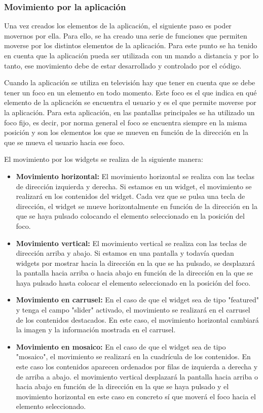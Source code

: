 \subsubsection{Movimiento por la aplicación}
\label{sec:movimiento_aplicacion}

Una vez creados los elementos de la aplicación, el siguiente paso es poder movernos por ella. Para ello, se ha creado una serie de funciones que permiten
moverse por los distintos elementos de la aplicación. Para este punto se ha tenido en cuenta que la aplicación pueda ser utilizada con un mando a distancia
y por lo tanto, ese movimiento debe de estar desarrollado y controlado por el código. 

Cuando la aplicación se utiliza en televisión hay que tener en cuenta que se debe tener un foco en un elemento en todo momento. Este foco es el que indica
en qué elemento de la aplicación se encuentra el usuario y es el que permite moverse por la aplicación. Para esta aplicación, en las pantallas principales
se ha utilizado un foco fijo, es decir, por norma general el foco se encuentra siempre en la misma posición y son los elementos los que se mueven en función
de la dirección en la que se mueva el usuario hacia ese foco. 

El movimiento por los widgets se realiza de la siguiente manera:
\begin{itemize}
    \item \textbf{Movimiento horizontal:} El movimiento horizontal se realiza con las teclas de dirección izquierda y derecha. Si estamos en un widget, el movimiento
    se realizará en los contenidos del widget. Cada vez que se pulsa una tecla de dirección, el widget se mueve horizontalmente en función de la dirección en la que se 
    haya pulsado colocando el elemento seleccionado en la posición del foco.
    \item \textbf{Movimiento vertical:} El movimiento vertical se realiza con las teclas de dirección arriba y abajo. Si estamos en una pantalla y todavía quedan widgets
    por mostrar hacia la dirección en la que se ha pulsado, se desplazará la pantalla hacia arriba o hacia abajo en función de la dirección en la que se haya pulsado 
    hasta colocar el elemento seleccionado en la posición del foco.
    \item \textbf{Movimiento en carrusel:} En el caso de que el widget sea de tipo "featured" y tenga el campo "slider" activado, el movimiento se realizará en el carrusel
    de los contenidos destacados. En este caso, el movimiento horizontal cambiará la imagen y la información mostrada en el carrusel.
    \item \textbf{Movimiento en mosaico:} En el caso de que el widget sea de tipo "mosaico", el movimiento se realizará en la cuadrícula de los contenidos. En este caso
    los contenidos aparecen ordenados por filas de izquierda a derecha y de arriba a abajo. el movimiento vertical desplazará la pantalla hacia arriba o hacia abajo
    en función de la dirección en la que se haya pulsado y el movimiento horizontal en este caso en concreto sí que moverá el foco hacia el elemento seleccionado.
\end{itemize}

